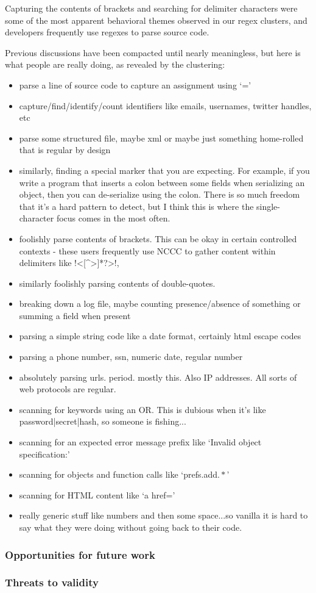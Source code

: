 Capturing the contents of brackets and searching for delimiter characters were some of the most apparent  behavioral themes observed in our regex clusters, and developers frequently use regexes to parse source code.

  Previous discussions have been compacted until nearly meaningless, but here is what people are really doing, as revealed by the clustering:
\begin{itemize}
\item parse a line of source code to capture an assignment using `='
\item capture/find/identify/count identifiers like emails, usernames, twitter handles, etc
\item parse some structured file, maybe xml or maybe just something home-rolled that is regular by design
\item similarly, finding a special marker that you are expecting.  For example, if you write a program that inserts a colon between some fields when serializing an object, then you can de-serialize using the colon.  There is so much freedom that it's a hard pattern to detect, but I think this is where the single-character focus comes in the most often.
\item foolishly parse contents of brackets.  This can be okay in certain controlled contexts - these users frequently use NCCC to gather content within delimiters like \cverb!<[^>]*?>!,
\item similarly foolishly parsing contents of double-quotes.
\item breaking down a log file, maybe counting presence/absence of something or summing a field when present
\item parsing a simple string code like a date format, certainly html escape codes
\item parsing a phone number, ssn, numeric date, regular number
\item absolutely parsing urls. period.  mostly this.  Also IP addresses.  All sorts of web protocols are regular.
\item scanning for keywords using an OR.  This is dubious when it's like password|secret|hash, so someone is fishing...
\item scanning for an expected error message prefix like `Invalid object specification:'
\item scanning for objects and function calls like `prefs.add\(.*\)'
\item scanning for HTML content like `a href='
\item really generic stuff like numbers and then some space...so vanilla it is hard to say what they were doing without going back to their code.

\end{itemize}


\subsubsection{Opportunities for future work}
\subsubsection{Threats to validity}
